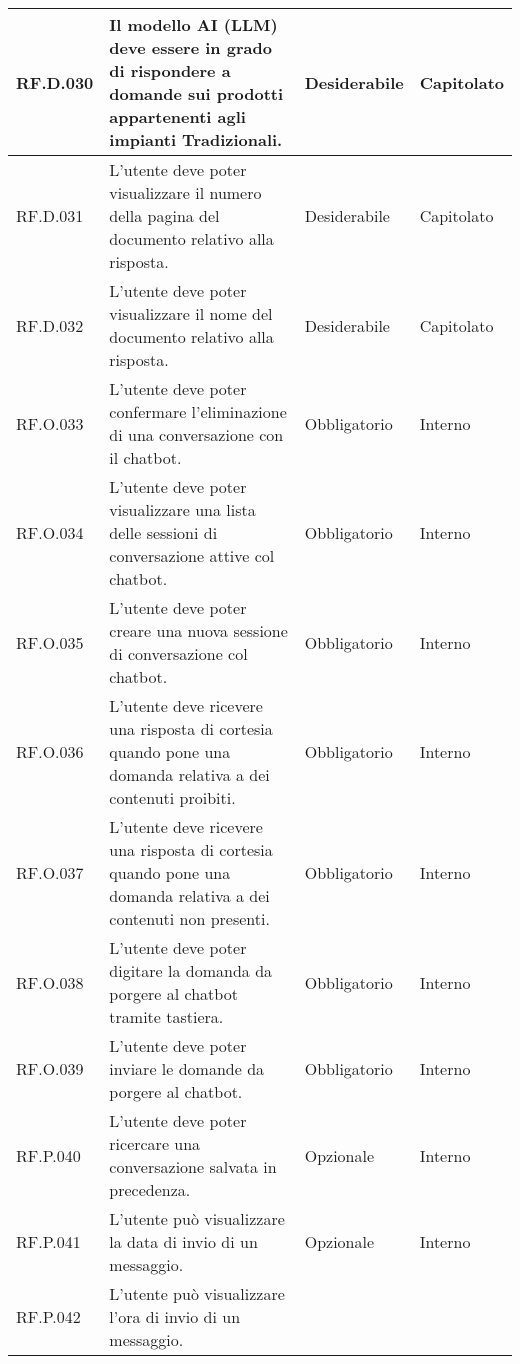 \begin{table}[H]
\centering
    \begin{tabular}{|C{2.7cm}|L{7.2cm}|C{2.7cm}|C{2cm}|}
        \hline
        RF.D.030 & Il modello AI (LLM) deve essere in grado di rispondere a domande sui prodotti appartenenti agli impianti Tradizionali.
         & Desiderabile & Capitolato \\
        \hline
        RF.D.031 & L’utente deve poter visualizzare il numero della pagina del documento relativo alla risposta.
         & Desiderabile & Capitolato \\
        \hline
        RF.D.032 & L’utente deve poter visualizzare il nome del documento relativo alla
        risposta.
         & Desiderabile & Capitolato \\
        \hline
        RF.O.033 & L’utente deve poter confermare l'eliminazione di una conversazione con il chatbot.
         & Obbligatorio & Interno \\
        \hline
        RF.O.034 & L’utente deve poter visualizzare una lista delle
        sessioni di conversazione attive col chatbot.
         & Obbligatorio & Interno \\
        \hline
        RF.O.035 & L’utente deve poter creare una nuova sessione di conversazione col chatbot.
         & Obbligatorio & Interno \\
        \hline
        RF.O.036 & L’utente deve ricevere una risposta di cortesia quando pone una domanda relativa a dei contenuti proibiti.
         & Obbligatorio & Interno \\
        \hline
        RF.O.037 & L’utente deve ricevere una risposta di cortesia quando pone una domanda relativa a dei contenuti non presenti.
         & Obbligatorio & Interno \\
        \hline
        RF.O.038 & L’utente deve poter digitare la domanda da porgere al chatbot tramite tastiera.
         & Obbligatorio & Interno \\
        \hline
        RF.O.039 & L’utente deve poter inviare le domande da porgere al chatbot.
         & Obbligatorio & Interno \\
        \hline
        RF.P.040 & L’utente deve poter ricercare una conversazione salvata in precedenza.
         & Opzionale & Interno \\
        \hline
        RF.P.041 & L’utente può visualizzare la data di invio di un messaggio.
         & Opzionale & Interno \\
        \hline
        RF.P.042 & L’utente può visualizzare l'ora di invio di un messaggio.

\end{tabular}
\end{table}
